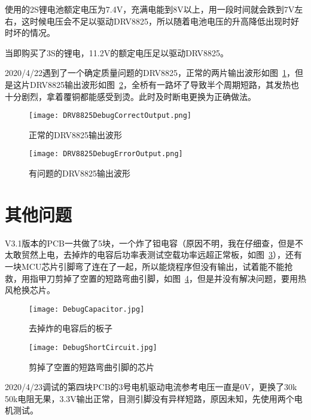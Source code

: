使用的2S锂电池额定电压为7.4V，充满电能到8V以上，用一段时间就会跌到7V左右，这时候电压会不足以驱动DRV8825，所以随着电池电压的升高降低出现时好时坏的情况。

当即购买了3S的锂电，11.2V的额定电压足以驱动DRV8825。

2020/4/22遇到了一个确定质量问题的DRV8825，正常的两片输出波形如图~\ref{fig:DRV8825DebugCorrectOutput}，但是这片DRV8825输出波形如图~\ref{fig:DRV8825DebugErrorOutput}，全桥有一路坏了导致半个周期短路，其发热也十分剧烈，拿着覆铜都能感受到烫。此时及时断电更换为正确做法。

\begin{figure}[htbp]
    \centering
    \texttt{[image: DRV8825DebugCorrectOutput.png]}
    \caption{正常的DRV8825输出波形}
    \label{fig:DRV8825DebugCorrectOutput}
\end{figure}

\begin{figure}[htbp]
    \centering
    \texttt{[image: DRV8825DebugErrorOutput.png]}
    \caption{有问题的DRV8825输出波形}
    \label{fig:DRV8825DebugErrorOutput}
\end{figure}


\section{其他问题}

V3.1版本的PCB一共做了5块，一个炸了钽电容（原因不明，我在仔细查，但是不太敢贸然上电，去掉炸的电容后功率表测试空载功率远超正常板，如图~\ref{fig:DebugCapacitor}），还有一块MCU芯片引脚弯了连在了一起，所以能烧程序但没有输出，试着能不能抢救，用指甲刀剪掉了空置的短路弯曲引脚，如图~\ref{fig:DebugShortCircuit}，但是并没有解决问题，要用热风枪换芯片。

\begin{figure}[htbp]
    \centering
    \texttt{[image: DebugCapacitor.jpg]}
    \caption{去掉炸的电容后的板子}
    \label{fig:DebugCapacitor}
\end{figure}

\begin{figure}[htbp]
    \centering
    \texttt{[image: DebugShortCircuit.jpg]}
    \caption{剪掉了空置的短路弯曲引脚的芯片}
    \label{fig:DebugShortCircuit}
\end{figure}

2020/4/23调试的第四块PCB的3号电机驱动电流参考电压一直是0V，更换了30k 50k电阻无果，3.3V输出正常，目测引脚没有异样短路，原因未知，先使用两个电机测试。